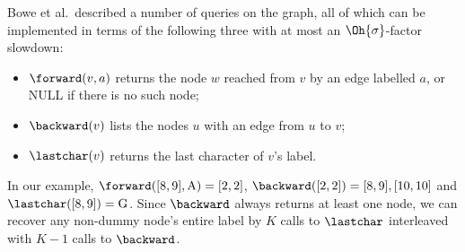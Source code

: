 Bowe et al.\ described a number of queries on the graph, all of which can be implemented in terms of the following three with at most an $\Oh{\sigma}$-factor slowdown:
\begin{itemize}
\item $\forward(v, a)$ returns the node $w$ reached from $v$ by an edge labelled $a$, or NULL if there is no such node;
\item $\backward(v)$ lists the nodes $u$ with an edge from $u$ to $v$;
\item $\lastchar(v)$ returns the last character of $v$'s label.
\end{itemize}
In our example, \(\forward \allowbreak ([8, 9], \mathrm{A}) \allowbreak =
\allowbreak [2, 2]\),
\(\backward \allowbreak ([2, 2]) \allowbreak = \allowbreak [8, 9], [10, 10]\) and
\(\lastchar \allowbreak ([8, 9]) \allowbreak = \allowbreak \mathrm{G}\).
Since $\backward$ always returns at least one node, we can recover any non-dummy node's entire label by $K$ calls to $\lastchar$ interleaved with \(K - 1\) calls to $\backward$.


